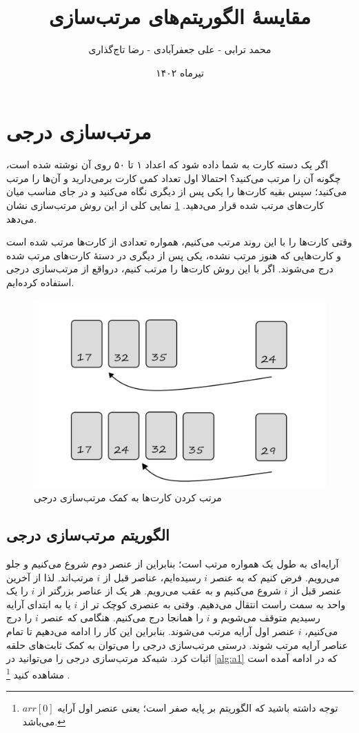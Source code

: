 \documentclass[12pt]{article}
\title{مقایسهٔ الگوریتم‌های مرتب‌سازی}
\author{محمد ترابی - علی جعفر‌آبادی - رضا تاج‌گذاری}
\date{تیرماه ۱۴۰۲}
\begin{document}
\maketitle

\pagebreak

\section{مرتب‌سازی درجی\protect{}}

اگر یک دسته کارت به شما داده شود که اعداد ۱ تا ۵۰ روی آن نوشته شده است، چگونه آن را مرتب
می‌کنید؟
احتمالا اول تعداد کمی کارت برمی‌دارید و آن‌ها را مرتب می‌کنید؛
سپس بقیه کارت‌ها را یکی پس از دیگری نگاه می‌کنید
و در جای مناسب میان کارت‌های مرتب شده قرار می‌دهید.
\cref{fig:f1}
نمایی کلی از این روش مرتب‌سازی نشان می‌دهد.

وقتی کارت‌ها را با این روند مرتب می‌کنیم،
همواره تعدادی از کارت‌ها مرتب شده است و کارت‌هایی که هنوز مرتب نشده، یکی پس از دیگری
در دستهٔ کارت‌های مرتب شده درج
می‌شوند.
اگر با این روش کارت‌ها را مرتب کنیم، درواقع از مرتب‌سازی درجی استفاده کرده‌ایم.

\begin{figure}[H]
  \centering
  \includegraphics[width=.8\textwidth]{figs/sortingCards2.jpg}
  \caption{
    مرتب کردن کارت‌ها به کمک مرتب‌سازی درجی
  }
  \label{fig:f1}
\end{figure}

\subsection*{الگوریتم مرتب‌سازی درجی}
آرایه‌ای به طول یک همواره مرتب است؛ بنابراین از عنصر دوم شروع می‌کنیم و جلو می‌رویم.
فرض کنیم که به عنصر
$i$
رسیده‌ایم،
عناصر قبل از
$i$
مرتب‌اند.
لذا از آخرین عنصر قبل از
$i$
شروع می‌کنیم و به عقب می‌رویم.
هر یک از عناصر بزرگتر از
$i$
را یک واحد به سمت راست انتقال
می‌دهیم.
وقتی به عنصری کوچک تر از
$i$
یا به ابتدای آرایه رسیدیم
متوقف می‌شویم و
$i$
را همانجا درج
می‌کنیم.
هنگامی که عنصر
$i$
را درج می‌کنیم،
$i$
عنصر اول آرایه مرتب می‌شوند.
بنابراین این کار را ادامه می‌دهیم تا تمام عناصر آرایه مرتب شوند.
درستی مرتب‌سازی درجی را می‌توان به کمک ثابت‌های حلقه
اثبات کرد.
\cite{clrs}
شبه‌کد مرتب‌سازی درجی را می‌توانید در
\cref{alg:a1}
که در ادامه آمده است
مشاهده کنید
\footnote{
  توجه داشته باشید که الگوریتم بر پایه صفر است؛ یعنی عنصر اول آرایه
  $arr[0]$
  می‌باشد.
}
.
\end{document}

